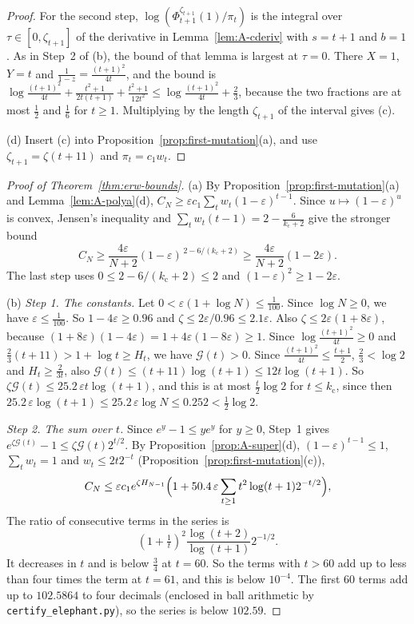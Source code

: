\begin{proof}
For the second step, $\log(\Phi^{\zeta_{t+1}}_{t+1}(1)/\pi_t)$ is the
integral over $\tau\in[0,\zeta_{t+1}]$ of the derivative in
Lemma~\ref{lem:A-cderiv} with $s=t+1$ and $b=1$. As in Step~2 of (b), the
bound of that lemma is largest at $\tau=0$. There $X=1$, $Y=t$ and
$\frac1{1-z}=\frac{(t+1)^2}{4t}$, and the bound is
$\log\frac{(t+1)^2}{4t}+\frac{t^2+1}{2t(t+1)}+\frac{t^2+1}{12t^2}
\le\log\frac{(t+1)^2}{4t}+\frac23$, because the two fractions are at most
$\frac12$ and $\frac16$ for $t\ge1$. Multiplying by the length
$\zeta_{t+1}$ of the interval gives (c).

(d) Insert (c) into Proposition~\ref{prop:first-mutation}(a), and use
$\zeta_{t+1}=\zeta(t+11)$ and $\pi_t=c_1w_t$.
\end{proof}

\begin{proof}[Proof of Theorem~\ref{thm:erw-bounds}]
(a) By Proposition~\ref{prop:first-mutation}(a) and
Lemma~\ref{lem:A-polya}(d),
$C_N\ge\varepsilon c_1\sum_tw_t(1-\varepsilon)^{t-1}$. Since
$u\mapsto(1-\varepsilon)^u$ is convex, Jensen's inequality and
$\sum_tw_t(t-1)=2-\frac6{{k_{\mathrm c}}+2}$ give the stronger bound
\begin{equation}\label{eq:center-jensen}
 C_N\ge\frac{4\varepsilon}{N+2}
 (1-\varepsilon)^{\,2-6/({k_{\mathrm c}}+2)}
 \ge\frac{4\varepsilon}{N+2}(1-2\varepsilon).
\end{equation}
The last step uses $0\le2-6/({k_{\mathrm c}}+2)\le2$ and
$(1-\varepsilon)^2\ge1-2\varepsilon$.

(b) \emph{Step 1. The constants.} Let $0<\varepsilon(1+\log N)\le\frac1{100}$.
Since $\log N\ge0$, we have $\varepsilon\le\frac1{100}$. So
$1-4\varepsilon\ge0.96$ and $\zeta\le2\varepsilon/0.96\le2.1\varepsilon$. Also
$\zeta\le2\varepsilon(1+8\varepsilon)$, because
$(1+8\varepsilon)(1-4\varepsilon)=1+4\varepsilon(1-8\varepsilon)\ge1$.
Since $\log\frac{(t+1)^2}{4t}\ge0$ and $\frac23(t+11)>1+\log t\ge H_t$, we
have $\mathcal G(t)>0$. Since $\frac{(t+1)^2}{4t}\le\frac{t+1}2$,
$\frac23<\log2$ and $H_t\ge\frac2{3t}$, also
$\mathcal G(t)\le(t+11)\log(t+1)\le12t\log(t+1)$. So
$\zeta\mathcal G(t)\le25.2\,\varepsilon t\log(t+1)$, and this is at most
$\frac t2\log2$ for $t\le {k_{\mathrm c}}$, since then
$25.2\,\varepsilon\log(t+1)\le25.2\,\varepsilon\log N\le0.252<\frac12\log2$.

\emph{Step 2. The sum over $t$.} Since $e^y-1\le ye^y$ for $y\ge0$, Step~1
gives $e^{\zeta\mathcal G(t)}-1\le\zeta\mathcal G(t)2^{t/2}$. By
Proposition~\ref{prop:A-super}(d), $(1-\varepsilon)^{t-1}\le1$,
$\sum_tw_t=1$ and $w_t\le2t2^{-t}$ (Proposition~\ref{prop:first-mutation}(c)),
\[
 C_N\le\varepsilon c_1e^{\zeta H_{N-1}}\Bigl(1+50.4\,\varepsilon
 \sum_{t\ge1}t^2\log(t+1)2^{-t/2}\Bigr),
\]
The ratio of consecutive terms in the series is
\[
 (1+\tfrac1t)^2\frac{\log(t+2)}{\log(t+1)}2^{-1/2}.
\]
It decreases in $t$ and is below $\frac34$ at $t=60$.
So the terms with $t>60$ add up to less than
four times the term at $t=61$, and this is below $10^{-4}$. The first 60 terms add up
to $102.5864$ to four decimals (enclosed in ball arithmetic by
\texttt{certify\_elephant.py}), so the series is below $102.59$.


\end{proof}
